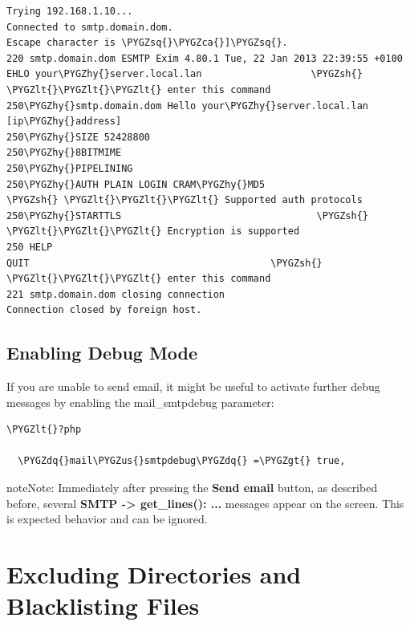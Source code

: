 \documentclass[letterpaper,10pt,english]{sphinxmanual}
\def\PYGZus{\char`\_}
\def\PYGZca{\char`\^}
\def\PYGZlt{\char`\<}
\def\PYGZgt{\char`\>}
\def\PYGZsh{\char`\#}
\def\PYGZhy{\char`\-}
\def\PYGZsq{\char`\'}
\def\PYGZdq{\char`\"}
\begin{document}
\begin{Verbatim}[commandchars=\\\{\}]
Trying 192.168.1.10...
Connected to smtp.domain.dom.
Escape character is \PYGZsq{}\PYGZca{}]\PYGZsq{}.
220 smtp.domain.dom ESMTP Exim 4.80.1 Tue, 22 Jan 2013 22:39:55 +0100
EHLO your\PYGZhy{}server.local.lan                   \PYGZsh{} \PYGZlt{}\PYGZlt{}\PYGZlt{} enter this command
250\PYGZhy{}smtp.domain.dom Hello your\PYGZhy{}server.local.lan [ip\PYGZhy{}address]
250\PYGZhy{}SIZE 52428800
250\PYGZhy{}8BITMIME
250\PYGZhy{}PIPELINING
250\PYGZhy{}AUTH PLAIN LOGIN CRAM\PYGZhy{}MD5                 \PYGZsh{} \PYGZlt{}\PYGZlt{}\PYGZlt{} Supported auth protocols
250\PYGZhy{}STARTTLS                                  \PYGZsh{} \PYGZlt{}\PYGZlt{}\PYGZlt{} Encryption is supported
250 HELP
QUIT                                          \PYGZsh{} \PYGZlt{}\PYGZlt{}\PYGZlt{} enter this command
221 smtp.domain.dom closing connection
Connection closed by foreign host.
\end{Verbatim}


\subsection{Enabling Debug Mode}
\label{configuration_server/email_configuration:enabling-debug-mode}
If you are unable to send email, it might be useful to activate further debug
messages by enabling the mail\_smtpdebug parameter:

\begin{Verbatim}[commandchars=\\\{\}]
\PYGZlt{}?php

  \PYGZdq{}mail\PYGZus{}smtpdebug\PYGZdq{} =\PYGZgt{} true,
\end{Verbatim}

\begin{notice}{note}{Note:}
Immediately after pressing the \textbf{Send email} button, as described
before, several \textbf{SMTP -\textgreater{} get\_lines(): ...} messages appear on the screen.
This is expected behavior and can be ignored.
\end{notice}


\section{Excluding Directories and Blacklisting Files}
\label{configuration_server/excluded_blacklisted_files::doc}\label{configuration_server/excluded_blacklisted_files:excluding-directories-and-blacklisting-files}
\end{document}
